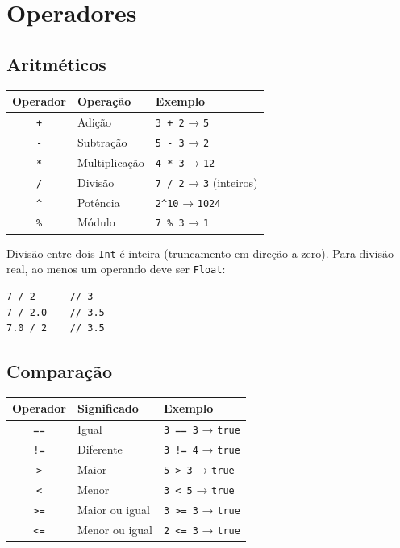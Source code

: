 \chapter{Operadores}

\section{Aritméticos}

\begin{center}
\begin{tabular}{cll}
\toprule
\textbf{Operador} & \textbf{Operação} & \textbf{Exemplo} \\
\midrule
\texttt{+}  & Adição               & \texttt{3 + 2} → \texttt{5} \\
\texttt{-}  & Subtração            & \texttt{5 - 3} → \texttt{2} \\
\texttt{*}  & Multiplicação        & \texttt{4 * 3} → \texttt{12} \\
\texttt{/}  & Divisão              & \texttt{7 / 2} → \texttt{3} (inteiros) \\
\texttt{\^} & Potência             & \texttt{2\^{}10} → \texttt{1024} \\
\texttt{\%} & Módulo               & \texttt{7 \% 3} → \texttt{1} \\
\bottomrule
\end{tabular}
\end{center}

Divisão entre dois \texttt{Int} é inteira (truncamento em direção a zero). Para
divisão real, ao menos um operando deve ser \texttt{Float}:

\begin{lstlisting}
7 / 2      // 3
7 / 2.0    // 3.5
7.0 / 2    // 3.5
\end{lstlisting}

\section{Comparação}

\begin{center}
\begin{tabular}{cll}
\toprule
\textbf{Operador} & \textbf{Significado} & \textbf{Exemplo} \\
\midrule
\texttt{==} & Igual               & \texttt{3 == 3} → \texttt{true} \\
\texttt{!=} & Diferente           & \texttt{3 != 4} → \texttt{true} \\
\texttt{>}  & Maior               & \texttt{5 > 3}  → \texttt{true} \\
\texttt{<}  & Menor               & \texttt{3 < 5}  → \texttt{true} \\
\texttt{>=} & Maior ou igual      & \texttt{3 >= 3} → \texttt{true} \\
\texttt{<=} & Menor ou igual      & \texttt{2 <= 3} → \texttt{true} \\
\bottomrule
\end{tabular}
\end{center}

